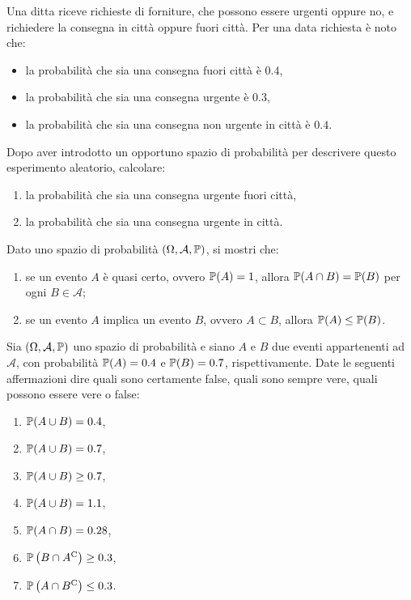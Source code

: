 Una ditta riceve richieste di forniture, che possono essere urgenti oppure no, e richiedere la consegna in città oppure fuori città. Per una data richiesta è noto che:
\begin{itemize}
\item la probabilità che sia una consegna fuori città è $0.4$,
\item la probabilità che sia una consegna urgente è $0.3$,
\item la probabilità che sia una consegna non urgente in città è $0.4$.
\end{itemize}

Dopo aver introdotto un opportuno spazio di probabilità per descrivere questo esperimento aleatorio, calcolare:
\begin{enumerate}
\item la probabilità che sia una consegna urgente fuori città,
\item la probabilità che sia una consegna urgente in città.
\end{enumerate}
\Esercizio{}

Dato uno spazio di probabilità $( \Omega ,\mathcal{A} ,\P)$, si mostri che:
\begin{enumerate}
\item se un evento $A$ è quasi certo, ovvero $\P( A) =1$, allora $\P( A\cap B) =\P( B)$ per ogni $B\in \mathcal{A}$;
\item se un evento $A$ implica un evento $B$, ovvero $A\subset B$, allora $\P( A) \leq \P( B)$.
\end{enumerate}
\Esercizio{}

Sia $( \Omega ,\mathcal{A} ,\P)$ uno spazio di probabilità e siano $A$ e $B$ due eventi appartenenti ad $\mathcal{A}$, con probabilità $\P( A) =0.4$ e $\P( B) =0.7$, rispettivamente. Date le seguenti affermazioni dire quali sono certamente false, quali sono sempre vere, quali possono essere vere o false:
\begin{enumerate}
\item $\P( A\cup B) =0.4$,
\item $\P( A\cup B) =0.7$,
\item $\P( A\cup B) \geq 0.7$,
\item $\P( A\cup B) =1.1$,
\item $\P( A\cap B) =0.28$,
\item $\P\left( B\cap A\comp\right) \geq 0.3$,
\item $\P\left( A\cap B\comp\right) \leq 0.3$.
\end{enumerate}
\Esercizio{}

